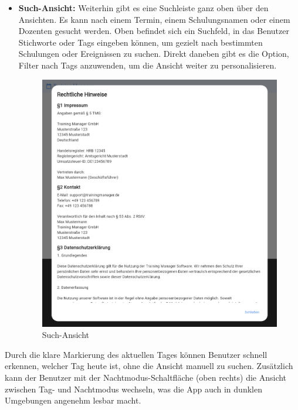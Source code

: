 \begin{itemize}
\item \textbf{Such-Ansicht:} Weiterhin gibt es eine Suchleiste ganz oben über den Ansichten. Es kann nach einem Termin, einem Schulungsnamen oder einem Dozenten gesucht werden. Oben befindet sich ein Suchfeld, in das Benutzer Stichworte oder Tags eingeben können, um gezielt nach bestimmten Schulungen oder Ereignissen zu suchen. Direkt daneben gibt es die Option, Filter nach Tags anzuwenden, um die Ansicht weiter zu personalisieren.
\begin{figure}[htbp!]
        \centering
        \includegraphics[scale=0.2]{img/flutter_32.png}
        \caption{Such-Ansicht}
        \label{Suche}
    \end{figure}
\end{itemize}

Durch die klare Markierung des aktuellen Tages können Benutzer schnell erkennen, welcher Tag heute ist, ohne die Ansicht manuell zu suchen. 
Zusätzlich kann der Benutzer mit der Nachtmodus-Schaltfläche (oben rechts) die Ansicht zwischen Tag- und Nachtmodus wechseln, was die App auch in dunklen Umgebungen angenehm lesbar macht. 


